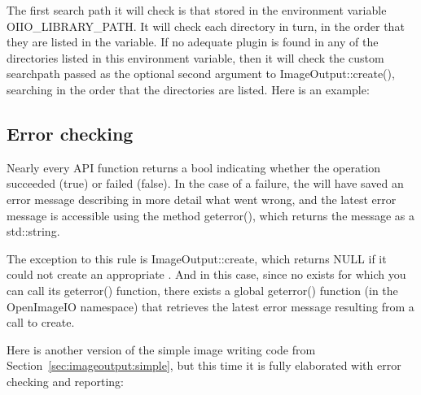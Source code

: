 The first search path it will check is that stored in the environment
variable {\cf OIIO_LIBRARY_PATH}.  It will check each directory in
turn, in the order that they are listed in the variable.  If no adequate
plugin is found in any of the directories listed in this environment
variable, then it will check the custom searchpath passed as the
optional second argument to {\cf ImageOutput::create()}, searching in
the order that the directories are listed.  Here is an example:



\subsection{Error checking}
\label{sec:imageoutput:errors}

Nearly every \ImageOutput API function returns a {\cf bool} indicating
whether the operation succeeded ({\cf true}) or failed ({\cf false}).
In the case of a failure, the \ImageOutput will have saved an error
message describing in more detail what went wrong, and the latest
error message is accessible using the \ImageOutput method 
{\cf geterror()}, which returns the message as a {\cf std::string}.

The exception to this rule is {\cf ImageOutput::create}, which returns
{\cf NULL} if it could not create an appropriate \ImageOutput.  And in
this case, since no \ImageOutput exists for which you can call its {\cf
  geterror()} function, there exists a global {\cf geterror()}
function (in the {\cf OpenImageIO} namespace) that retrieves the latest
error message resulting from a call to {\cf create}.

Here is another version of the simple image writing code from
Section~\ref{sec:imageoutput:simple}, but this time it is fully 
elaborated with error checking and reporting:

